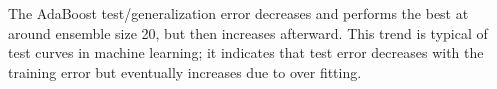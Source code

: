\documentclass[12pt]{article}
\begin{document}
The AdaBoost test/generalization error decreases and performs the best at around ensemble size 20, but then increases afterward. This trend is typical of test curves in machine learning; it indicates that test error decreases with the training error but eventually increases due to over fitting.

%
%
\end{document}
